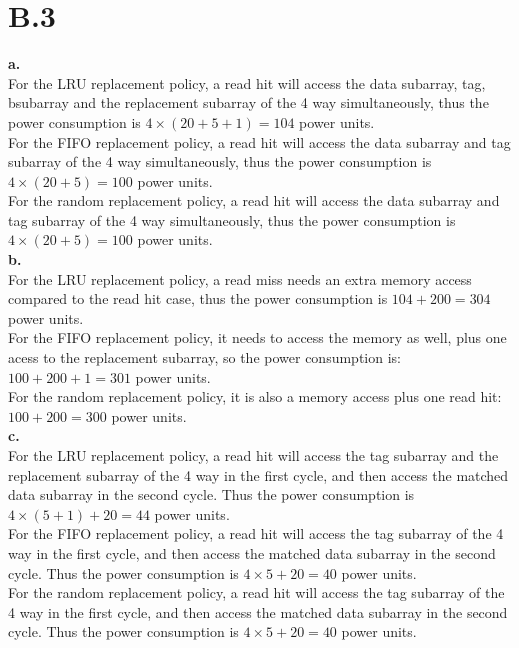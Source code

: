 \documentclass{article}
\begin{document}
\section{B.3}

\indent \textbf{a.}\\
\indent For the LRU replacement policy, a read hit will access the data subarray, tag, bsubarray and the replacement subarray of the 4 way simultaneously, thus the power consumption is $4\times(20+5+1)=104$ power units.\\

For the FIFO replacement policy, a read hit will access the data subarray and tag subarray of the 4 way simultaneously, thus the power consumption is $4\times(20+5)=100$ power units.\\

For the random replacement policy, a read hit will access the data subarray and tag subarray of the 4 way simultaneously, thus the power consumption is $4\times(20+5)=100$ power units.\\

\textbf{b.}\\
\indent For the LRU replacement policy, a read miss needs an extra memory access compared to the read hit case, thus the power consumption is $104+200=304$ power units.\\

For the FIFO replacement policy, it needs to access the memory as well, plus one acess to the replacement subarray, so the power consumption is: $100+200+1=301$ power units.\\

For the random replacement policy, it is also a memory access plus one read hit: $100+200=300$ power units.\\

\textbf{c.}\\
\indent For the LRU replacement policy, a read hit will access the tag subarray and the replacement subarray of the 4 way in the first cycle, and then access the matched data subarray in the second cycle. Thus the power consumption is $4\times(5+1)+20=44$ power units.\\

For the FIFO replacement policy, a read hit will access the tag subarray of the 4 way in the first cycle, and then access the matched data subarray in the second cycle. Thus the power consumption is $4\times5+20=40$ power units.\\

For the random replacement policy, a read hit will access the tag subarray of the 4 way in the first cycle, and then access the matched data subarray in the second cycle. Thus the power consumption is $4\times5+20=40$ power units.\\
\end{document}
